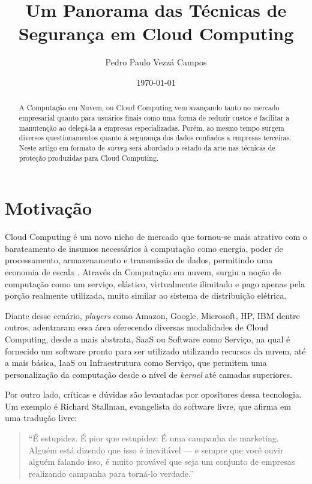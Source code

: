 \documentclass[brazil,12pt]{article}
\begin{document}
\title{Um Panorama das Técnicas de Segurança em Cloud Computing}
\author{Pedro Paulo Vezzá Campos}
\date{\today}
\maketitle

\begin{abstract}
A Computação em Nuvem, ou Cloud Computing vem avançando tanto no mercado
empresarial quanto para usuários finais como uma forma de
reduzir custos e facilitar a manutenção ao delegá-la a empresas especializadas.
Porém, ao mesmo tempo surgem diversos questionamentos quanto à segurança dos dados confiados a
empresas terceiras. Neste artigo em formato de \emph{survey} será abordado o
estado da arte nas técnicas de proteção produzidas para Cloud Computing.  
\end{abstract}

\section{Motivação}
Cloud Computing é um novo nicho de mercado que tornou-se mais atrativo com o
barateamento de insumos necessários à computação como energia, poder de
processamento, armazenamento e transmissão de dados, permitindo uma economia de
escala \cite{above-clouds}. Através da Computação em nuvem, surgiu a noção de
computação como um serviço, elástico, virtualmente ilimitado e pago apenas pela
porção realmente utilizada, muito similar ao sistema de distribuição elétrica.

Diante desse cenário, \emph{players} como Amazon, Google,
Microsoft, HP, IBM dentre outros, adentraram essa área oferecendo diversas
modalidades de Cloud Computing, desde a mais abstrata, SaaS ou Software como
Serviço, na qual é fornecido um software pronto para ser utilizado utilizando
recursos da nuvem, até a mais básica, IaaS ou Infraestrutura como Serviço, que
permitem uma personalização da computação desde o nível de \emph{kernel} até
camadas superiores.

Por outro lado, críticas e dúvidas são levantadas por opositores dessa
tecnologia. Um exemplo é Richard Stallman, evangelista do software livre, que
afirma em uma tradução livre:

\begin{quote}
``É estupidez. É pior que estupidez: É uma campanha de marketing. Alguém está
dizendo que isso é inevitável — e sempre que você ouvir alguém falando isso, é
muito provável que seja um conjunto de empresas realizando campanha para
torná-lo verdade.'' \cite{stallman-cloud}
\end{quote}
\end{document}
